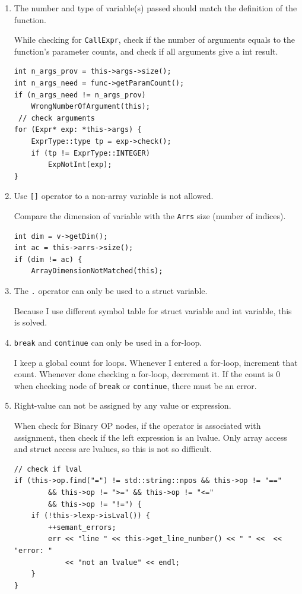 \documentclass[11pt]{article}
\begin{document}
\begin{enumerate}
\item The number and type of variable(s) passed should match the definition of
the function.

While checking for \texttt{CallExpr}, check if the number of arguments equals to the
function's parameter counts, and check if all arguments give a int
result.
\begin{verbatim}
int n_args_prov = this->args->size();
int n_args_need = func->getParamCount();
if (n_args_need != n_args_prov)
    WrongNumberOfArgument(this);
 // check arguments
for (Expr* exp: *this->args) {
    ExprType::type tp = exp->check();
    if (tp != ExprType::INTEGER)
        ExpNotInt(exp);
}
\end{verbatim}

\item Use \texttt{[]} operator to a non-array variable is not allowed.

Compare the dimension of variable with the \texttt{Arrs} size (number of
indices).
\begin{verbatim}
int dim = v->getDim();
int ac = this->arrs->size();
if (dim != ac) {
    ArrayDimensionNotMatched(this);
\end{verbatim}

\item The \texttt{.} operator can only be used to a struct variable.

Because I use different symbol table for struct variable and int
variable, this is solved.

\item \texttt{break} and \texttt{continue} can only be used in a for-loop.

I keep a global count for loops. Whenever I entered a for-loop,
increment that count. Whenever done checking a for-loop, decrement it.
If the count is 0 when checking node of \texttt{break} or \texttt{continue}, there
must be an error.

\item Right-value can not be assigned by any value or expression.

When check for Binary OP nodes, if the operator is associated with
assignment, then check if the left expression is an lvalue. Only array
access and struct access are lvalues, so this is not so difficult.

\begin{verbatim}
// check if lval
if (this->op.find("=") != std::string::npos && this->op != "=="
        && this->op != ">=" && this->op != "<="
        && this->op != "!=") {
    if (!this->lexp->isLval()) {
        ++semant_errors;
        err << "line " << this->get_line_number() << " " <<  << "error: "
            << "not an lvalue" << endl;
    }
}
\end{verbatim}


\end{enumerate}
\end{document}
